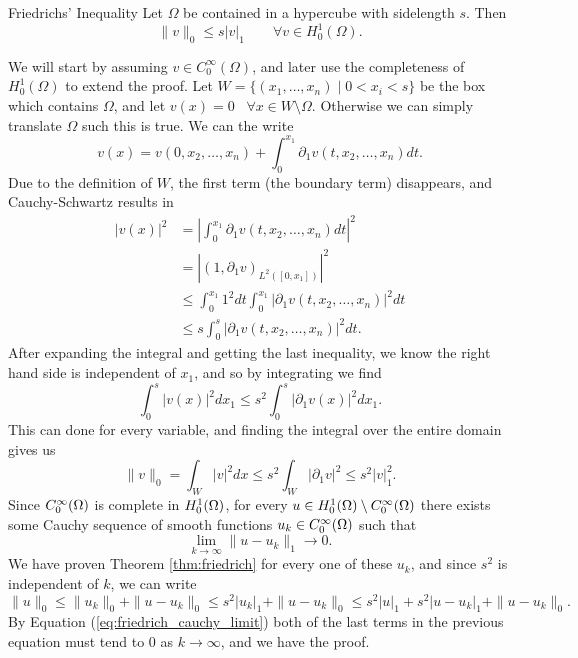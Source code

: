 \begin{thmx}{Friedrichs' Inequality}
Let $\Omega$ be contained in a hypercube with sidelength $s$. Then 
\begin{equation*}
    \| v \|_0 \leq s |v|_1 \quad \quad \forall v \in H_0^1(\Omega).
\end{equation*}
\label{thm:friedrich}
\end{thmx}
\begin{bev}
We will start by assuming $v \in C_0^{\infty}(\Omega)$, and later use the 
completeness of $H_0^1(\Omega)$ to extend the proof.
Let $W = \{ (x_1, \ldots, x_n) \mid 0 < x_i < s \}$ be the box 
which contains $\Omega$, and let $v(x)=0$ \, $\forall x
\in W\setminus \Omega$. Otherwise we can simply translate $\Omega$ such 
this is true.
 We can the write 
\begin{equation*}
v(x)=v(0, x_2, \ldots, x_n) + \int_{0}^{x_1} \partial _1 v(t,x_2, \ldots, x_n) dt.
\end{equation*}
Due to the definition of $W$, the first term (the boundary term) 
disappears, and Cauchy-Schwartz results in 
\begin{align*}
    |v(x)|^2 &= \left|\int_{0}^{x_1} \partial _1 v(t,x_2, \ldots, x_n) dt \right|^2 \\ 
    &= |(1, \partial _1 v)_{L^2([0,x_1])}|^2 \\
    & \leq \int_{0}^{x_1} 1^2 dt \int_{0}^{x_1}|\partial_1 v(t, x_2, \ldots, x_n)|^2 dt \\ 
    &\leq s \int_{0}^{s}|\partial_1 v(t, x_2, \ldots, x_n)|^2 dt. 
\end{align*}
After expanding the integral and getting the last inequality, we know 
the right hand side is independent of $x_1$, and so by integrating we find 
\begin{equation*}
    \int_{0}^{s}|v(x)|^2dx_1 \leq s^2\int_{0}^{s}|\partial _1 v(x)|^2dx_1.
\end{equation*}
This can done for every variable, and finding the integral over the entire 
domain gives us 
\begin{equation*}
    \|v\|_0 = \int_{W}|v|^2 dx \leq s^2 \int_{W} |\partial _1v|^2 \leq s^2 |v|_1^2.
\end{equation*}
Since $C^\infty_0(\Omega)$ is complete in $H_0^1(\Omega)$, for every $u \in H_0^1(\Omega)\setminus C^\infty_0(\Omega)$
there exists some Cauchy sequence of smooth functions $u_k \in C^\infty_0(\Omega)$
 such that 
\begin{equation}
    \lim_{k \to \infty} \| u-u_k\|_1 \to 0.
    \label{eq:friedrich_cauchy_limit}
\end{equation}
We have proven Theorem \ref*{thm:friedrich} for every one of these $u_k$, and 
since $s^2$ is independent of $k$, we can write 
\begin{equation*}
    \|u\|_0 \leq \|u_k\|_0 + \|u-u_k\|_0 \leq  s^2|u_k|_1 +  \|u-u_k\|_0 \leq s^2|u|_1 + s^2|u-u_k|_1 + \|u-u_k\|_0.
\end{equation*}
By Equation (\ref*{eq:friedrich_cauchy_limit}) both of the last terms in the 
previous equation must tend to $0$ as $k \to \infty$, and we have the proof.
\end{bev}